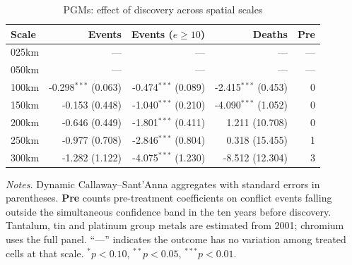 \begin{table}[H]
\centering
\footnotesize
\caption{PGMs: effect of discovery across spatial scales}
\label{tab:pgms_robustness}
\begin{tabular}{lrrrr}
\toprule
\textbf{Scale} & \textbf{Events} & \textbf{Events ($e\geq10$)} & \textbf{Deaths} & \textbf{Pre} \\
\midrule
025km & --- & --- & --- & --- \\
050km & --- & --- & --- & --- \\
100km & -0.298$^{***}$ (0.063) & -0.474$^{***}$ (0.089) & -2.415$^{***}$ (0.453) & 0 \\
150km & -0.153 (0.448) & -1.040$^{***}$ (0.210) & -4.090$^{***}$ (1.052) & 0 \\
200km & -0.646 (0.449) & -1.801$^{***}$ (0.411) & 1.211 (10.708) & 0 \\
250km & -0.977 (0.708) & -2.846$^{***}$ (0.804) & 0.318 (15.455) & 1 \\
300km & -1.282 (1.122) & -4.075$^{***}$ (1.230) & -8.512 (12.304) & 3 \\
\bottomrule
\end{tabular}
\begin{minipage}{0.92\textwidth}\vspace{4pt}\scriptsize \textit{Notes.} Dynamic Callaway--Sant'Anna aggregates with standard errors in parentheses. \textbf{Pre} counts pre-treatment coefficients on conflict events falling outside the simultaneous confidence band in the ten years before discovery. Tantalum, tin and platinum group metals are estimated from 2001; chromium uses the full panel. ``---'' indicates the outcome has no variation among treated cells at that scale. $^{*}p<0.10$, $^{**}p<0.05$, $^{***}p<0.01$.\end{minipage}
\end{table}

